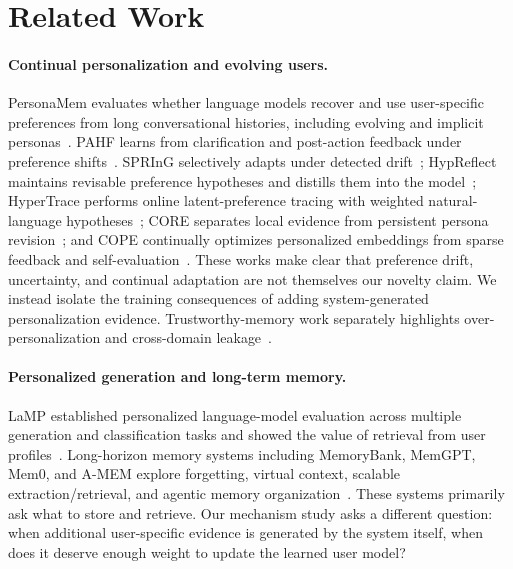 \documentclass[10pt,twocolumn]{article}
\begin{document}
\section{Related Work}
\paragraph{Continual personalization and evolving users.}
PersonaMem evaluates whether language models recover and use user-specific preferences from long conversational histories, including evolving and implicit personas~\cite{personamem}. PAHF learns from clarification and post-action feedback under preference shifts~\cite{pahf}. SPRInG selectively adapts under detected drift~\cite{spring}; HypReflect maintains revisable preference hypotheses and distills them into the model~\cite{hypreflect}; HyperTrace performs online latent-preference tracing with weighted natural-language hypotheses~\cite{hypertrace}; CORE separates local evidence from persistent persona revision~\cite{core}; and COPE continually optimizes personalized embeddings from sparse feedback and self-evaluation~\cite{cope}. These works make clear that preference drift, uncertainty, and continual adaptation are not themselves our novelty claim. We instead isolate the training consequences of adding system-generated personalization evidence. Trustworthy-memory work separately highlights over-personalization and cross-domain leakage~\cite{beyond}.

\paragraph{Personalized generation and long-term memory.}
LaMP established personalized language-model evaluation across multiple generation and classification tasks and showed the value of retrieval from user profiles~\cite{lamp}. Long-horizon memory systems including MemoryBank, MemGPT, Mem0, and A-MEM explore forgetting, virtual context, scalable extraction/retrieval, and agentic memory organization~\cite{memorybank,memgpt,mem0,amem}. These systems primarily ask what to store and retrieve. Our mechanism study asks a different question: when additional user-specific evidence is generated by the system itself, when does it deserve enough weight to update the learned user model?
\end{document}
